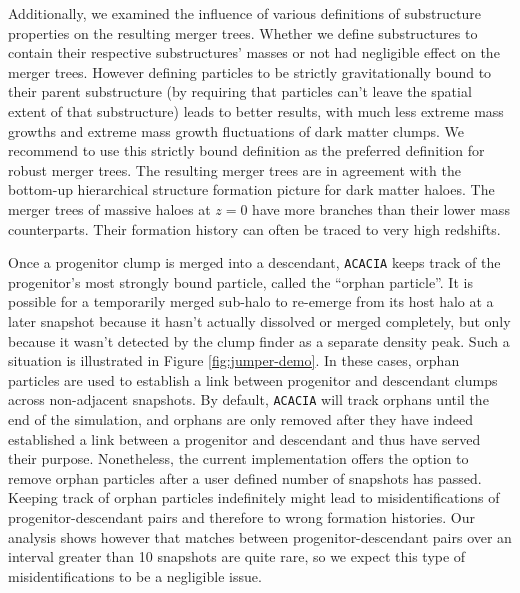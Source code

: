 \documentclass[a4paper,twocolumn,fleqn,usenatbib]{mnras}
\begin{document}
Additionally,  we examined  the  influence of  various definitions  of
substructure  properties on  the  resulting merger  trees. Whether  we
define substructures to contain their respective substructures' masses
or not  had negligible effect  on the merger trees.   However defining
particles  to  be  strictly  gravitationally  bound  to  their  parent
substructure  (by requiring  that  particles can't  leave the  spatial
extent of that  substructure) leads to better results,  with much less
extreme  mass growths  and extreme  mass growth  fluctuations of  dark
matter clumps.  We recommend to  use this strictly bound definition as
the  preferred  definition for  robust  merger  trees.  The  resulting
merger  trees  are  in   agreement  with  the  bottom-up  hierarchical
structure formation picture  for dark matter haloes.  The merger trees
of massive  haloes at $z=0$ have  more branches than their  lower mass
counterparts.  Their  formation history  can often  be traced  to very
high redshifts.

Once a progenitor  clump is merged into  a descendant, \texttt{ACACIA}
keeps track of the progenitor's most strongly bound particle, called the
``orphan particle''.  It is possible for a temporarily merged sub-halo
to re-emerge from its host halo  at a later snapshot because it hasn't
actually dissolved  or merged completely,  but only because  it wasn't
detected  by the  clump finder  as a  separate density  peak.  Such  a
situation  is illustrated  in Figure  \ref{fig:jumper-demo}. In  these
cases,  orphan  particles  are  used   to  establish  a  link  between
progenitor  and  descendant   clumps  across  non-adjacent  snapshots.
By  default, \texttt{ACACIA} will track orphans until the end of the 
simulation, and orphans are only removed after they have indeed established
a link between a progenitor and descendant and thus have served their
purpose. Nonetheless, the current implementation 
offers the option to remove orphan particles after a user defined number
of snapshots has passed. Keeping track of orphan particles indefinitely
might lead to misidentifications of progenitor-descendant pairs and 
therefore to wrong formation histories. Our analysis shows however that 
matches between progenitor-descendant pairs over an interval greater 
than 10 snapshots are quite rare, so we expect this type of 
misidentifications to be a negligible issue. 
\end{document}
